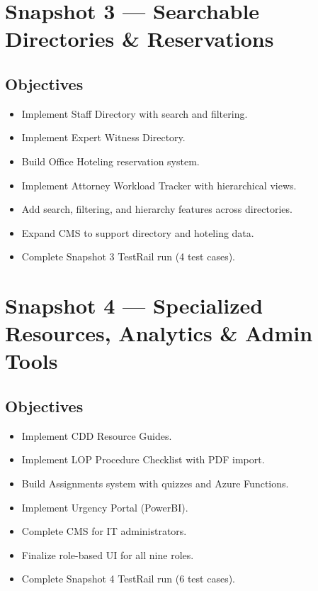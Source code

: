 \documentclass{article}
\begin{document}
\section*{Snapshot 3 --- Searchable Directories \& Reservations}

\subsection*{Objectives}
\begin{itemize}
    \item Implement Staff Directory with search and filtering.
    \item Implement Expert Witness Directory.
    \item Build Office Hoteling reservation system.
    \item Implement Attorney Workload Tracker with hierarchical views.
    \item Add search, filtering, and hierarchy features across directories.
    \item Expand CMS to support directory and hoteling data.
    \item Complete Snapshot 3 TestRail run (4 test cases).
\end{itemize}

\section*{Snapshot 4 --- Specialized Resources, Analytics \& Admin Tools}

\subsection*{Objectives}
\begin{itemize}
    \item Implement CDD Resource Guides.
    \item Implement LOP Procedure Checklist with PDF import.
    \item Build Assignments system with quizzes and Azure Functions.
    \item Implement Urgency Portal (PowerBI).
    \item Complete CMS for IT administrators.
    \item Finalize role-based UI for all nine roles.
    \item Complete Snapshot 4 TestRail run (6 test cases).
\end{itemize}
\end{document}
